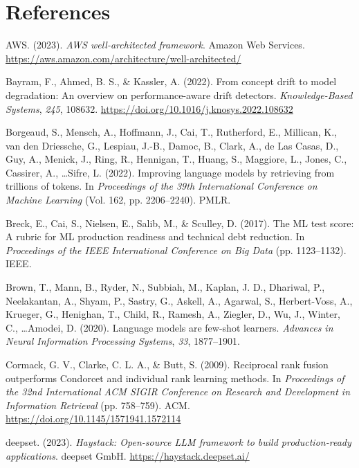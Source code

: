 \chapter*{References}

{\raggedright
\setlength{\parskip}{8pt}
\everypar{\hangindent=0.5in}

AWS. (2023). \textit{AWS well-architected framework}. Amazon Web Services. \url{https://aws.amazon.com/architecture/well-architected/}

Bayram, F., Ahmed, B. S., \& Kassler, A. (2022). From concept drift to model degradation: An overview on performance-aware drift detectors. \textit{Knowledge-Based Systems}, \textit{245}, 108632. \url{https://doi.org/10.1016/j.knosys.2022.108632}

Borgeaud, S., Mensch, A., Hoffmann, J., Cai, T., Rutherford, E., Millican, K., van den Driessche, G., Lespiau, J.-B., Damoc, B., Clark, A., de Las Casas, D., Guy, A., Menick, J., Ring, R., Hennigan, T., Huang, S., Maggiore, L., Jones, C., Cassirer, A., \ldots Sifre, L. (2022). Improving language models by retrieving from trillions of tokens. In \textit{Proceedings of the 39th International Conference on Machine Learning} (Vol. 162, pp. 2206--2240). PMLR.

Breck, E., Cai, S., Nielsen, E., Salib, M., \& Sculley, D. (2017). The ML test score: A rubric for ML production readiness and technical debt reduction. In \textit{Proceedings of the IEEE International Conference on Big Data} (pp. 1123--1132). IEEE.

Brown, T., Mann, B., Ryder, N., Subbiah, M., Kaplan, J. D., Dhariwal, P., Neelakantan, A., Shyam, P., Sastry, G., Askell, A., Agarwal, S., Herbert-Voss, A., Krueger, G., Henighan, T., Child, R., Ramesh, A., Ziegler, D., Wu, J., Winter, C., \ldots Amodei, D. (2020). Language models are few-shot learners. \textit{Advances in Neural Information Processing Systems}, \textit{33}, 1877--1901.

Cormack, G. V., Clarke, C. L. A., \& Butt, S. (2009). Reciprocal rank fusion outperforms Condorcet and individual rank learning methods. In \textit{Proceedings of the 32nd International ACM SIGIR Conference on Research and Development in Information Retrieval} (pp. 758--759). ACM. \url{https://doi.org/10.1145/1571941.1572114}

deepset. (2023). \textit{Haystack: Open-source LLM framework to build production-ready applications}. deepset GmbH. \url{https://haystack.deepset.ai/}

}
